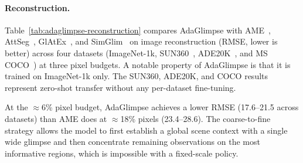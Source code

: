 \paragraph{Reconstruction.} Table~\ref{tab:adaglimpse-reconstruction} compares AdaGlimpse with AME~, AttSeg~\cite{seifi2020segment}, GlAtEx~\cite{seifi2021glimpse}, and SimGlim~\cite{Jha2023WACV} on image reconstruction (RMSE, lower is better) across four datasets (ImageNet-1k, SUN360~\cite{xiao2012recognizing}, ADE20K~\cite{zhou2017scene}, and MS COCO~\cite{lin2014microsoft}) at three pixel budgets. A notable property of AdaGlimpse is that it is trained on ImageNet-1k only. The SUN360, ADE20K, and COCO results represent zero-shot transfer without any per-dataset fine-tuning.

At the $\approx$6\% pixel budget, AdaGlimpse achieves a lower RMSE (17.6--21.5 across datasets) than AME does at $\approx$18\% pixels (23.4--28.6). The coarse-to-fine strategy allows the model to first establish a global scene context with a single wide glimpse and then concentrate remaining observations on the most informative regions, which is impossible with a fixed-scale policy.

